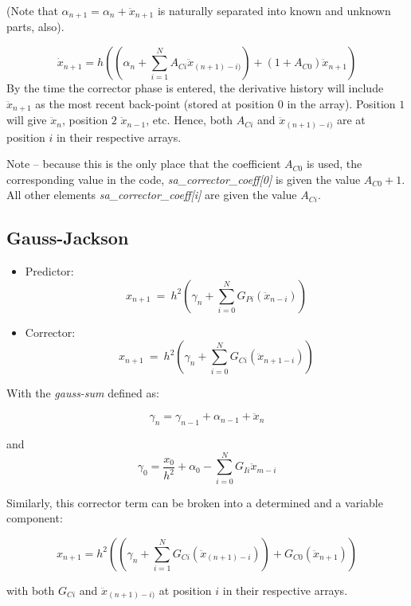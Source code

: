 (Note that  ${\alpha }_{n+1}={\alpha }_{n}+{\ddot{x}}_{n+1}$ is naturally
separated into known and unknown parts, also).

\begin{equation}\label{eq:ACO_offset}
{\dot{x}}_{n+1}=h\left(\left(\alpha_{n}+
\sum_{i=1}^{N}A_{Ci} \ddot{x}_{(n+1)-i)}\right)+(1+A_{C0}) 
\ddot{x}_{n+1}\right)
\end{equation}
By the time the corrector phase is entered, the derivative
history will include  $\ddot{x}_{n+1}$ as the most recent back-point (stored 
at position $0$ in the array).  Position $1$ will give 
$\ddot{x}_{n}$, position $2$ $\ddot{x}_{n-1}$, etc. Hence, both
$A_{Ci}$ and $\ddot{x}_{(n+1)-i)}$ are at position $i$ in their respective
arrays.

Note -- because this is the only place that the coefficient 
$A_{C0}$ is used, the corresponding value in the code,
\textit{sa\_corrector\_coeff[0]} is given the value 
$A_{C0}+1$. All other elements
\textit{sa\_corrector\_coeff[i]} are given the value $A_{Ci}$.

\subsection{Gauss-Jackson}
\begin{itemize}
 \item Predictor:  
\begin{equation}\label{eq:gj_predictor}
 x_{n+1}\ =\ h^{2}\left(\gamma_{n}+
 \sum_{i=0}^{N}G_{Pi}({\ddot{x}}_{n-i})\right)
\end{equation}

\item Corrector:
\begin{equation}\label{eq:gj_corrector}
x_{n+1}\ =\ h^{2}\left(\gamma _{n}+
\sum_{i=0}^{N}G_{Ci}({\ddot{x}}_{n+1-i})\right)
\end{equation}
\end{itemize}
With the \textit{gauss-sum} defined as:

\begin{equation*}
\gamma _{n}=\gamma_{n-1}+\alpha _{n-1}+ \ddot{x}_{n}
\end{equation*}

and
\begin{equation*}
\gamma_{0} =\frac{x_0}{h^2}+\alpha_{0}-\sum_{i=0}^{N}G_{Ii} \ddot{x}_{m-i}
\end{equation*}


Similarly, this corrector term can be broken into a determined and a 
variable component:

\begin{equation*}
x_{n+1} = h^{2}\left(\left(\gamma _{n}+\sum
_{i=1}^{N}G_{Ci}(\ddot{x}_{(n+1)-i})\right)+G_{C0}(\ddot{x}_{n+1})\right)
\end{equation*}

with both
$G_{Ci}$ and $\ddot{x}_{(n+1)-i)}$ at position $i$ in their respective
arrays.

